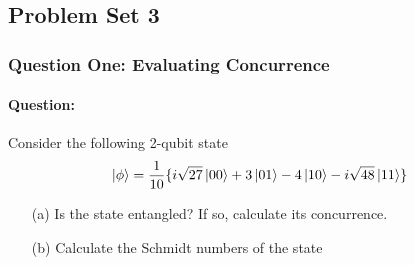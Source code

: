\documentclass[reprint, amsmath,amssymb, aps]{revtex4-2}
\begin{document}
        \subsection{Problem Set 3}
            \subsubsection{Question One: Evaluating Concurrence}
                \paragraph{Question:}
                    Consider the following 2-qubit state
                    \begin{equation*}
                        \ket{\phi} = \frac{1}{10}\{i\sqrt{27}\ket{00} + 3\ket{01} - 4\ket{10}-i\sqrt{48}\ket{11}\}
                    \end{equation*}

                    \begin{itemize}
                        \item[(a)] Is the state entangled? If so, calculate its concurrence.
                        \item[(b)] Calculate the Schmidt numbers of the state
                    \end{itemize}
\end{document}
